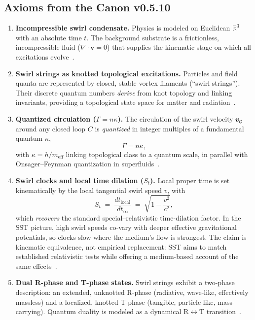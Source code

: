 \documentclass[10pt,reprint,aps,onecolumn,nofootinbib]{revtex4-2}
\newcommand{\vect}[1]{\boldsymbol{#1}} %
\newcommand{\vv}{\vect{v}}
\begin{document}
    \subsection*{Axioms from the Canon v0.5.10}
        \begin{enumerate}
        \item \textbf{Incompressible swirl condensate.} Physics is modeled on Euclidean $\mathbb{R}^3$ with an absolute time $t$. The background substrate is a frictionless, incompressible fluid ($\nabla \cdot \vv=0$) that supplies the kinematic stage on which all excitations evolve~\cite{1}.

        \item \textbf{Swirl strings as knotted topological excitations.} Particles and field quanta are represented by closed, stable vortex filaments (``swirl strings''). Their discrete quantum numbers \emph{derive} from knot topology and linking invariants, providing a topological state space for matter and radiation~\cite{1}.

        \item \textbf{Quantized circulation ($\Gamma=n\kappa$).} The circulation of the swirl velocity $\vect{v}_{\mkern-2mu\scriptscriptstyle\boldsymbol{\circlearrowleft}}$ around any closed loop $C$ is \emph{quantized} in integer multiples of a fundamental quantum $\kappa$,
        \[
            \Gamma = n\kappa,
        \]
        with $\kappa=h/m_{\mathrm{eff}}$ linking topological class to a quantum scale, in parallel with Onsager–Feynman quantization in superfluids~\cite{1}.

        \item \textbf{Swirl clocks and local time dilation ($S_t$).} Local proper time is set kinematically by the local tangential swirl speed $v$, with
        \begin{equation}
        S_t \;=\; \frac{dt_\text{local}}{dt_\infty} \;=\; \sqrt{1-\frac{v^2}{c^2}},
        \label{eq:swirlclock}
        \end{equation}
        which \emph{recovers} the standard special–relativistic time-dilation factor. In the SST picture, high swirl speeds co-vary with deeper effective gravitational potentials, so clocks slow where the medium’s flow is strongest. The claim is kinematic equivalence, not empirical replacement: SST aims to match established relativistic tests while offering a medium-based account of the same effects~\cite{1}.

        \item \textbf{Dual R-phase and T-phase states.} Swirl strings exhibit a two-phase description: an extended, unknotted R-phase (radiative, wave-like, effectively massless) and a localized, knotted T-phase (tangible, particle-like, mass-carrying). Quantum duality is modeled as a dynamical R$\leftrightarrow$T transition~\cite{1}.


\end{enumerate}
\end{document}
